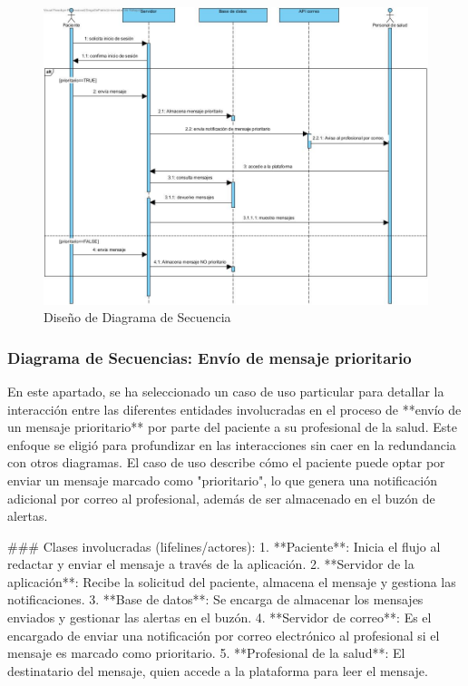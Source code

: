\documentclass{article}
\begin{document}
\begin{figure}[h!]
	\begin{center} 
		\includegraphics[width=1\textwidth]{images/Diagrama_de_secuencia_rehabilitacion.jpg}
		\caption{Diseño de Diagrama de Secuencia}
		\label{fig:secuencia_diagrama}
	\end{center}
\end{figure}

\subsubsection{Diagrama de Secuencias: Envío de mensaje prioritario}

En este apartado, se ha seleccionado un caso de uso particular para detallar la interacción entre las diferentes entidades involucradas en el proceso de **envío de un mensaje prioritario** por parte del paciente a su profesional de la salud. Este enfoque se eligió para profundizar en las interacciones sin caer en la redundancia con otros diagramas. El caso de uso describe cómo el paciente puede optar por enviar un mensaje marcado como "prioritario", lo que genera una notificación adicional por correo al profesional, además de ser almacenado en el buzón de alertas.

### Clases involucradas (lifelines/actores):
1. **Paciente**: Inicia el flujo al redactar y enviar el mensaje a través de la aplicación.
2. **Servidor de la aplicación**: Recibe la solicitud del paciente, almacena el mensaje y gestiona las notificaciones.
3. **Base de datos**: Se encarga de almacenar los mensajes enviados y gestionar las alertas en el buzón.
4. **Servidor de correo**: Es el encargado de enviar una notificación por correo electrónico al profesional si el mensaje es marcado como prioritario.
5. **Profesional de la salud**: El destinatario del mensaje, quien accede a la plataforma para leer el mensaje.
\end{document}
